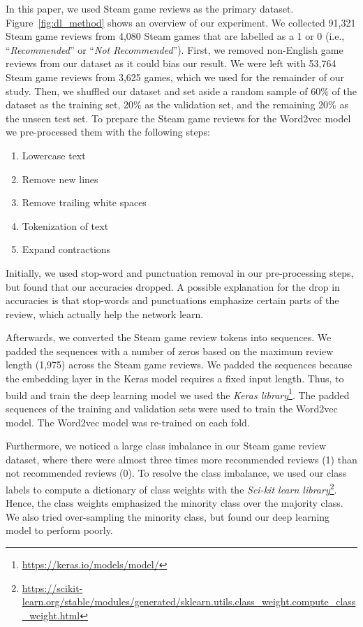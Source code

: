 \documentclass[conference]{IEEEtran}
\begin{document}
In this paper, we used Steam game reviews as the primary dataset. Figure~\ref{fig:dl_method} shows an overview of our experiment. We collected 91,321 Steam game reviews from 4,080 Steam games that are labelled as a 1 or 0 (i.e., ``\textit{Recommended}'' or ``\textit{Not Recommended}''). First, we removed non-English game reviews from our dataset as it could bias our result. We were left with 53,764 Steam game reviews from 3,625 games, which we used for the remainder of our study. Then, we shuffled our dataset and set aside a random sample of 60\% of the dataset as the training set, 20\% as the validation set, and the remaining 20\% as the unseen test set. To prepare the Steam game reviews for the Word2vec model we pre-processed them with the following steps:

\begin{enumerate}
	\item Lowercase text
	\item Remove new lines
	\item Remove trailing white spaces
	\item Tokenization of text
	\item Expand contractions
\end{enumerate}

Initially, we used stop-word and punctuation removal in our pre-processing steps, but found that our accuracies dropped. A possible explanation for the drop in accuracies is that stop-words and punctuations emphasize certain parts of the review, which actually help the network learn.


Afterwards, we converted the Steam game review tokens into sequences. We padded the sequences with a number of zeros based on the maximum review length (1,975) across the Steam game reviews. We padded the sequences because the embedding layer in the Keras model requires a fixed input length. Thus, to build and train the deep learning model we used the \textit{Keras library}\footnote{\url{https://keras.io/models/model/}}. The padded sequences of the training and validation sets were used to train the Word2vec model. The Word2vec model was re-trained on each fold.


Furthermore, we noticed a large class imbalance in our Steam game review dataset, where there were almost three times more recommended reviews (1) than not recommended reviews (0). To resolve the class imbalance, we used our class labels to compute a dictionary of class weights with the \textit{Sci-kit learn library}\footnote{\url{https://scikit-learn.org/stable/modules/generated/sklearn.utils.class\_weight.compute\_class\_weight.html}}. Hence, the class weights emphasized the minority class over the majority class. We also tried over-sampling the minority class, but found our deep learning model to perform poorly.
\end{document}
